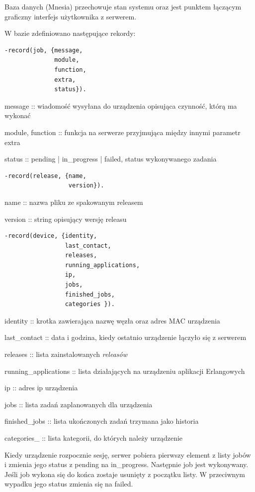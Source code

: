 \documentclass[polish,12pt]{aghthesis}
\begin{document}
Baza danych (Mnesia) przechowuje stan systemu oraz jest punktem łączącym graficzny interfejs użytkownika z serwerem.

W bazie zdefiniowano następujące rekordy:

\begin{verbatim}
-record(job, {message,
              module,
              function,
              extra,
              status}).
\end{verbatim}

message :: wiadomość wysyłana do urządzenia opisująca czynność, którą ma wykonać

module, function :: funkcja na serwerze przyjmująca między innymi parametr extra

status :: pending | in\_progress | failed, status wykonywanego zadania

\begin{verbatim}
-record(release, {name,
                  version}).
\end{verbatim}

name :: nazwa pliku ze spakowanym releasem

version :: string opisujący wersję releasu

\begin{verbatim}
-record(device, {identity,
                 last_contact,
                 releases,
                 running_applications,
                 ip,
                 jobs,
                 finished_jobs,
                 categories }).
\end{verbatim}

identity :: krotka zawierająca nazwę węzła oraz adres MAC urządzenia

last\_contact :: data i godzina, kiedy ostatnio urządzenie łączyło się z serwerem

releases :: lista zainstalowanych \emph{releasów}

running\_applications :: lista działających na urządzeniu aplikacji Erlangowych

ip :: adres ip urządzenia

jobs :: lista zadań zaplanowanych dla urządzenia

finished\_jobs :: lista ukończonych zadań trzymana jako historia

categories\_ :: lista kategorii, do których należy urządzenie

Kiedy urządzenie rozpocznie sesję, serwer pobiera pierwszy element z listy jobów i zmienia jego status z pending na in\_progress. Następnie job jest wykonywany. Jeśli job wykona się do końca zostaje usunięty z początku listy. W przeciwnym wypadku jego status zmienia się na failed.
\end{document}

